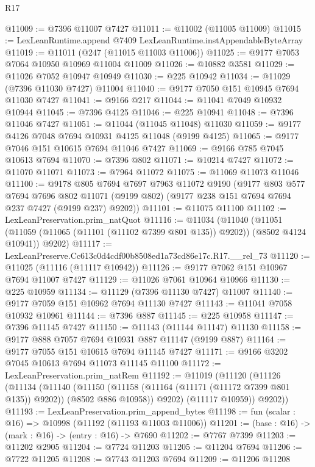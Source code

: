 \begin{lexlean}{R17}
\begin{coremodule}
@11009 := @7396 @11007 @7427
@11011 := @11002 (@11005 @11009)
@11015 := LexLeanRuntime.append @7409 LexLeanRuntime.instAppendableByteArray
@11019 := @11011 (@247 (@11015 @11003 @11006))
@11025 := @9177 @7053 @7064 @10950 @10969 @11004 @11009
@11026 := @10882 @3581
@11029 := @11026 @7052 @10947 @10949
@11030 := @225 @10942
@11034 := @11029 (@7396 @11030 @7427) @11004
@11040 := @9177 @7050 @151 @10945 @7694 @11030 @7427
@11041 := @9166 @217
@11044 := @11041 @7049 @10932 @10944
@11045 := @7396 @4125
@11046 := @225 @10941
@11048 := @7396 @11046 @7427
@11051 := @11044 (@11045 @11048) @11030
@11059 := @9177 @4126 @7048 @7694 @10931 @4125 @11048 (@9199 @4125)
@11065 := @9177 @7046 @151 @10615 @7694 @11046 @7427
@11069 := @9166 @785 @7045 @10613 @7694
@11070 := @7396 @802
@11071 := @10214 @7427
@11072 := @11070 @11071
@11073 := @7964 @11072
@11075 := @11069 @11073 @11046
@11100 := @9178
    @805
    @7694
    @7697
    @7963
    @11072
    @9190
    (@9177
      @803
      @577
      @7694
      @7696
      @802
      @11071
      (@9199 @802)
      (@9177 @238 @151 @7694 @7694 @237 @7427 (@9199 @237) @9202))
@11101 := @11075 @11100
@11102 := LexLeanPreservation.prim_natQuot
@11116 := @11034
    (@11040
      (@11051 (@11059 (@11065 (@11101 (@11102 @7399 @801 @135)) @9202)) (@8502 @4124 @10941))
      @9202)
@11117 := LexLeanPreserve.Cc613c0d4cdf00b8508ed1a73cd86e17c.R17.__rel_73
@11120 := @11025 (@11116 (@11117 @10942))
@11126 := @9177 @7062 @151 @10967 @7694 @11007 @7427
@11129 := @11026 @7061 @10964 @10966
@11130 := @225 @10959
@11134 := @11129 (@7396 @11130 @7427) @11007
@11140 := @9177 @7059 @151 @10962 @7694 @11130 @7427
@11143 := @11041 @7058 @10932 @10961
@11144 := @7396 @887
@11145 := @225 @10958
@11147 := @7396 @11145 @7427
@11150 := @11143 (@11144 @11147) @11130
@11158 := @9177 @888 @7057 @7694 @10931 @887 @11147 (@9199 @887)
@11164 := @9177 @7055 @151 @10615 @7694 @11145 @7427
@11171 := @9166 @3202 @7045 @10613 @7694 @11073 @11145 @11100
@11172 := LexLeanPreservation.prim_natRem
@11192 := @11019
    (@11120
      (@11126
        (@11134
          (@11140
            (@11150 (@11158 (@11164 (@11171 (@11172 @7399 @801 @135)) @9202)) (@8502 @886 @10958))
            @9202)
          (@11117 @10959))
        @9202))
@11193 := LexLeanPreservation.prim_append_bytes
@11198 := fun (scalar : @16) => @10998 (@11192 (@11193 @11003 @11006))
@11201 := (base : @16) -> (mark : @16) -> (entry : @16) -> @7690
@11202 := @7767 @7399
@11203 := @11202 @2905
@11204 := @7724 @11203
@11205 := @11204 @7694
@11206 := @7722 @11205
@11208 := @7743 @11203 @7694
@11209 := @11206 @11208

\end{coremodule}
\end{lexlean}
